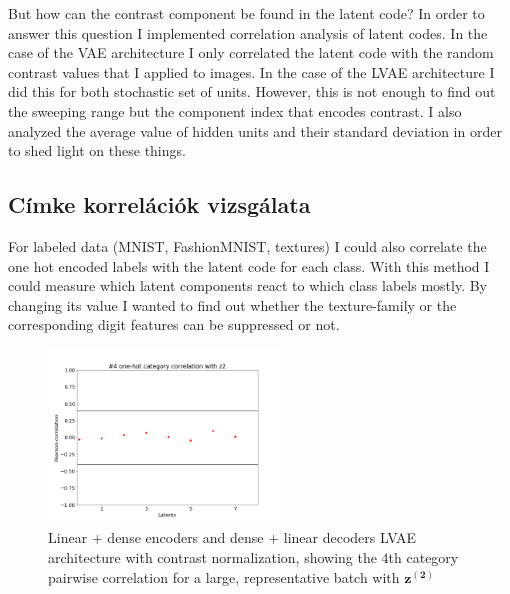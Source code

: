 \documentclass[12pt, english]{article}
\begin{document}
\vspace{4mm}

\par But how can the contrast component be found in the latent code? In order to answer this question I implemented correlation analysis of latent codes. In the case of the VAE architecture I only correlated the latent code with the random contrast values that I applied to images. In the case of the LVAE architecture I did this for both stochastic set of units. However, this is not enough to find out the sweeping range but the component index that encodes contrast. I also analyzed the average value of hidden units and their standard deviation in order to shed light on these things.

\vspace{4mm}

\subsection{Címke korrelációk vizsgálata}

\vspace{4mm}

\par For labeled data (MNIST, FashionMNIST, textures) I could also correlate the one hot encoded labels with the latent code for each class. With this method I could measure which latent components react to which class labels mostly. By changing its value I wanted to find out whether the texture-family or the corresponding digit features can be suppressed or not.

\vspace{4mm}

\begin{figure}[H]
    \centering
    \includegraphics[width=0.55\textwidth]{17_DenseLinLinLadderVAE_contrastNorm-cat-4-to-z2-corr.png}
    \caption{Linear + dense encoders and dense + linear decoders LVAE architecture with contrast normalization, showing the $4$th category pairwise correlation for a large, representative batch with $\bm{z^{(2)}}$}
\end{figure}
\end{document}
